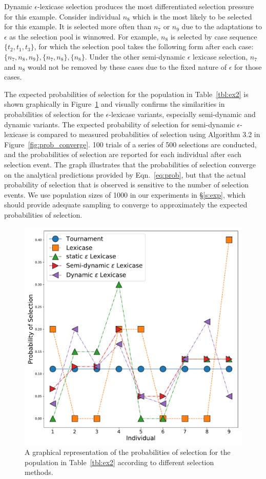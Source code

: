 \documentclass[twoside]{article}
\begin{document}
Dynamic $\epsilon$-lexicase selection produces the most differentiated selection pressure for this example. Consider individual $n_8$ which is the most likely to be selected for this example. It is selected more often than $n_7$ or $n_9$ due to the adaptations to $\epsilon$ as the selection pool is winnowed. For example, $n_8$ is selected by case sequence $\{t_2,t_1,t_3\}$, for which the selection pool takes the following form after each case: $\{n_7, n_8, n_9\}, \{n_7, n_8\}, \{n_8\}$. Under the other semi-dynamic $\epsilon$ lexicase selection, $n_7$ and $n_8$ would not be removed by these cases due to the fixed nature of $\epsilon$ for those cases. 

The expected probabilities of selection for the population in Table~\ref{tbl:ex2} is shown graphically in Figure~\ref{fig:prob} and visually confirms the similarities in probabilities of selection for the $\epsilon$-lexicase variants, especially semi-dynamic and dynamic variants. The expected probability of selection for semi-dynamic $\epsilon$-lexicase is compared to measured probabilities of selection using Algorithm 3.2 in Figure~\ref{fig:prob_converge}. 100 trials of a series of 500 selections are conducted, and the probabilities of selection are reported for each individual after each selection event. The graph illustrates that the probabilities of selection converge on the analytical predictions provided by Eqn.~\ref{eq:prob}, but that the actual probability of selection that is observed is sensitive to the number of selection events. We use population sizes of 1000 in our experiments in \S\ref{s:exp}, which should provide adequate sampling to converge to approximately the expected probabilities of selection. 

\begin{figure}
\centering
  \includegraphics[height = 0.4\textheight]{figs/probabilities.pdf}
  \caption{A graphical representation of the probabilities of selection for the population in Table~\ref{tbl:ex2} according to different selection methods.}\label{fig:prob}
\end{figure}
\end{document}
